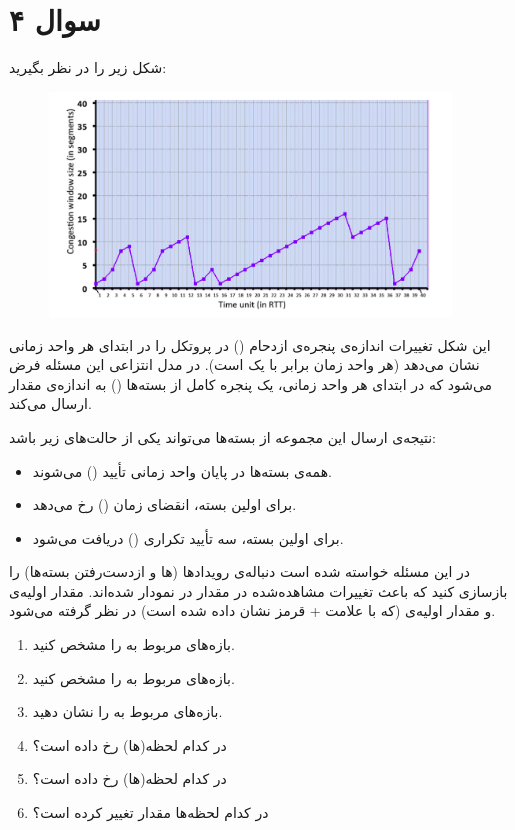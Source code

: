 \section*{سوال ۴}

شکل زیر را در نظر بگیرید:  

\begin{figure}[H]
    \centering
    \includegraphics[width=0.95\textwidth]{Questions/pics/Q4.png}
    \caption{}
    \label{fig:small-example}
\end{figure}

این شکل تغییرات اندازه‌ی پنجره‌ی ازدحام () در پروتکل  را در ابتدای هر واحد زمانی نشان می‌دهد (هر واحد زمان برابر با یک  است).  
در مدل انتزاعی این مسئله فرض می‌شود که  در ابتدای هر واحد زمانی، یک پنجره کامل از بسته‌ها () به اندازه‌ی مقدار  ارسال می‌کند.  

نتیجه‌ی ارسال این مجموعه از بسته‌ها می‌تواند یکی از حالت‌های زیر باشد:
\begin{itemize}
    \item همه‌ی بسته‌ها در پایان واحد زمانی تأیید () می‌شوند.
    \item برای اولین بسته، انقضای زمان () رخ می‌دهد.
    \item برای اولین بسته، سه تأیید تکراری () دریافت می‌شود.
\end{itemize}

در این مسئله خواسته شده است دنباله‌ی رویدادها (ها و از‌دست‌رفتن بسته‌ها) را بازسازی کنید که باعث تغییرات مشاهده‌شده در مقدار  در نمودار شده‌اند.  
مقدار اولیه‌ی  و مقدار اولیه‌ی  (که با علامت + قرمز نشان داده شده است) در نظر گرفته می‌شود.

\begin{enumerate}[label=\alph*)]
    \item بازه‌های مربوط به  را مشخص کنید.
    \item بازه‌های مربوط به  را مشخص کنید.
    \item بازه‌های مربوط به  را نشان دهید.
    \item در کدام لحظه(ها)  رخ داده است؟
    \item در کدام لحظه‌(ها)  رخ داده است؟
    \item در کدام لحظه‌ها مقدار  تغییر کرده است؟
\end{enumerate}